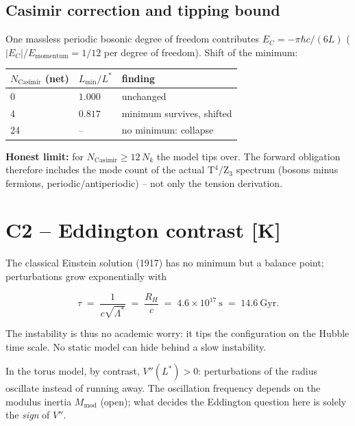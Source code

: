 \documentclass[11pt]{report}
\begin{document}
\subsection{Casimir correction and tipping bound}

One massless periodic bosonic degree of freedom contributes
$E_C = -\pi\hbar c/(6L)$ ($|E_C|/E_\text{momentum} = 1/12$ per
degree of freedom). Shift of the minimum:

\begin{center}
\begin{tabular}{lll}
\toprule
$N_\text{Casimir}$ (net) & $L_{\min}/L^{*}$ & finding \\
\midrule
0  & $1.000$ & unchanged \\
4  & $0.817$ & minimum survives, shifted \\
24 & --      & no minimum: collapse \\
\bottomrule
\end{tabular}
\end{center}

\textbf{Honest limit:} for $N_\text{Casimir} \ge 12\,N_k$ the model
tips over. The forward obligation therefore includes the mode count
of the actual T$^4$/Z$_3$ spectrum (bosons minus fermions,
periodic/antiperiodic) -- not only the tension derivation.

\section{C2 -- Eddington contrast [K]}

The classical Einstein solution (1917) has no minimum but a balance
point; perturbations grow exponentially with

\begin{equation}
  \tau \;=\; \frac{1}{c\sqrt{\Lambda^{*}}} \;=\; \frac{R_H}{c}
  \;=\; 4.6\times10^{17}~\text{s} \;=\; 14.6~\text{Gyr}.
\end{equation}

The instability is thus no academic worry: it tips the configuration
on the Hubble time scale. No static model can hide behind a slow
instability.

In the torus model, by contrast, $V''(L^{*}) > 0$: perturbations of
the radius oscillate instead of running away. The oscillation
frequency depends on the modulus inertia $M_\text{mod}$ (open); what
decides the Eddington question here is solely the \emph{sign} of
$V''$.
\end{document}
